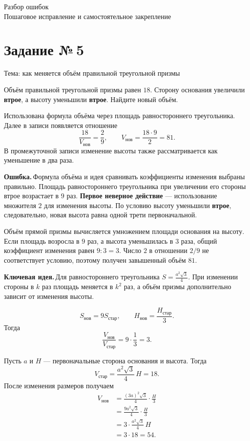 \documentclass[a4paper,12pt]{article}
\newcommand{\keyidea}{\textcolor{darkaccent}{\textbf{Ключевая идея.}}\,}
\newcommand{\errorlead}{\textcolor{alert}{\textbf{Ошибка.}}\,}
\newcommand{\parthead}[1]{\par\vspace{4pt}{\bfseries\textcolor{ink}{#1}}\par\vspace{1pt}}
\newcommand{\taskhead}[2]{\phantomsection\label{task:#1}\section*{Задание №\,#1}\textcolor{muted}{#2}\par\smallskip}
\begin{document}
\newpage
\thispagestyle{fancy}
\vspace*{\fill}
\begin{center}
{\LARGE\textcolor{darkaccent}{Разбор ошибок}}\\[12pt]
{\normalsize\textcolor{muted}{Пошаговое исправление и самостоятельное закрепление}}
\end{center}
\vspace*{\fill}
\newpage

\taskhead{5}{Тема: как меняется объём правильной треугольной призмы}
\parthead{Условие}
Объём правильной треугольной призмы равен $18$. Сторону основания увеличили \textbf{втрое}, а высоту уменьшили \textbf{втрое}. Найдите новый объём.

\parthead{Ваше решение и ответ}
Использована формула объёма через площадь равностороннего треугольника. Далее в записи появляется отношение
\[
\frac{18}{V_{\text{нов}}}=\frac{2}{9},
\qquad V_{\text{нов}}=\frac{18\cdot9}{2}=81.
\]
В промежуточной записи изменение высоты также рассматривается как уменьшение в два раза.

\parthead{Где возникает ошибка}
\errorlead Формула объёма и идея сравнивать коэффициенты изменения выбраны правильно. Площадь равностороннего треугольника при увеличении его стороны втрое возрастает в $9$ раз. \textbf{Первое неверное действие} --- использование множителя $2$ для изменения высоты. По условию высоту уменьшили \textbf{втрое}, следовательно, новая высота равна одной трети первоначальной.

\parthead{Почему это неверно}
Объём прямой призмы вычисляется умножением площади основания на высоту. Если площадь возросла в $9$ раз, а высота уменьшилась в $3$ раза, общий коэффициент изменения равен $9:3=3$. Число $2$ в отношении $2/9$ не соответствует условию, поэтому получен завышенный объём $81$.

\parthead{Ключевая идея}
\keyidea Для равностороннего треугольника $S=\frac{a^2\sqrt3}{4}$. При изменении стороны в $k$ раз площадь меняется в $k^2$ раз, а объём призмы дополнительно зависит от изменения высоты.

\parthead{Исправление от правильного шага}
\[
S_{\text{нов}}=9S_{\text{стар}},\qquad
H_{\text{нов}}=\frac{H_{\text{стар}}}{3}.
\]
Тогда
\[
\frac{V_{\text{нов}}}{V_{\text{стар}}}
=9\cdot\frac13=3.
\]

\parthead{Полное правильное решение}
Пусть $a$ и $H$ --- первоначальные сторона основания и высота. Тогда
\[
V_{\text{стар}}=\frac{a^2\sqrt3}{4}\,H=18.
\]
После изменения размеров получаем
\begin{align*}
V_{\text{нов}}
&=\frac{(3a)^2\sqrt3}{4}\cdot\frac{H}{3}\\
&=\frac{9a^2\sqrt3}{4}\cdot\frac{H}{3}\\
&=3\cdot\frac{a^2\sqrt3}{4}\,H\\
&=3\cdot18=54.
\end{align*}
\end{document}
